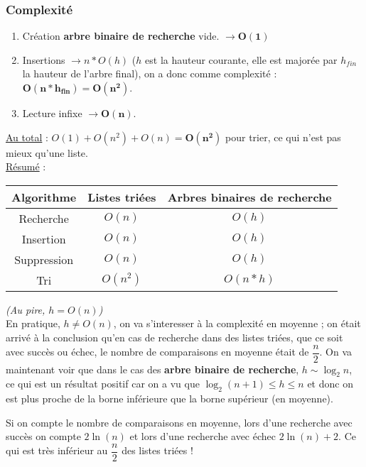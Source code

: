 \documentclass{article}
\newcommand{\abr}{\textbf{arbre binaire de recherche }}
\newcommand{\abrb}{\textbf{arbre binaire de recherche}}
\begin{document}
\subsubsection*{Complexité}

\begin{enumerate}
 \item Création \abr vide. $\rightarrow \mathbf{O(1)}$
 \item Insertions $\rightarrow n*O(h)$ ($h$ est la hauteur courante, elle est majorée par $h_{fin}$ la hauteur de l'arbre
 final), on a donc comme complexité : $\mathbf{O(n*h_{fin}) = O(n^2)}$.
 \item Lecture infixe $\rightarrow \mathbf{O(n)}$.
\end{enumerate}

\noindent\underline{Au total} : $O(1)+O(n^2)+O(n)=\mathbf{O(n^2)}$ pour trier, ce qui n'est pas mieux qu'une liste. \\

\noindent\underline{Résumé} : \\

\begin{tabular}{|*{3}{c|}}
\hline
\textbf{Algorithme} & \textbf{Listes triées} & \textbf{Arbres binaires de recherche} \\
\hline
Recherche & $O(n)$ & $O(h)$ \\
\hline
Insertion & $O(n)$ & $O(h)$ \\
\hline
Suppression & $O(n)$ & $O(h)$ \\
\hline
Tri & $O(n^2)$ & $O(n*h)$ \\
\hline
\end{tabular}

\textit{(Au pire, $h = O(n)$)} \\

En pratique, $h \neq O(n)$, on va s'interesser à la complexité en moyenne ; on était arrivé à la conclusion qu'en cas de 
recherche dans des listes triées, que ce soit avec succès ou échec, le nombre de comparaisons en moyenne était de
$\dfrac{n}{2}$. On va maintenant voir que dans le cas des \abrb, $h \sim \log_2n$, ce qui est un résultat positif car on a
vu que $\log_2(n+1) \leq h \leq n$ et donc on est plus proche de la borne inférieure que la borne supérieur (en moyenne).

\noindent Si on compte le nombre de comparaisons en moyenne, lors d'une recherche avec succès on compte $2 \ln{(n)}$ et lors
d'une recherche avec échec $2 \ln{(n)} + 2$. Ce qui est très inférieur au $\dfrac{n}{2}$ des listes triées ! \\
\end{document}
